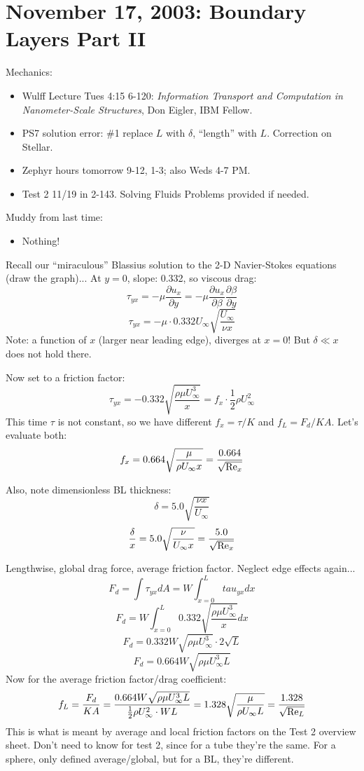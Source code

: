 \documentclass{report}
\begin{document}
\section{November 17, 2003: Boundary Layers Part II}

Mechanics:
\begin{itemize}
\item Wulff Lecture Tues 4:15 6-120: {\em Information Transport and Computation
    in Nanometer-Scale Structures}, Don Eigler, IBM Fellow.
\item PS7 solution error: \#1 replace $L$ with $\delta$, ``length'' with $L$.
  Correction on Stellar.
\item Zephyr hours tomorrow 9-12, 1-3; also Weds 4-7 PM.
\item Test 2 11/19 in 2-143.  Solving Fluids Problems provided if needed.
\end{itemize}

\noindent Muddy from last time:
\begin{itemize}
\item Nothing!
\end{itemize}

Recall our ``miraculous'' Blassius solution to the 2-D Navier-Stokes equations
(draw the graph)...  At $y=0$, slope: 0.332, so viscous drag:
$$\tau_{yx} = -\mu\frac{\partial u_x}{\partial y} =
-\mu \frac{\partial u_x}{\partial\beta}\frac{\partial\beta}{\partial y}$$
$$\tau_{yx} = -\mu\cdot0.332U_\infty\sqrt{\frac{U_\infty}{\nu x}}$$
Note: a function of $x$ (larger near leading edge), diverges at $x=0$!  But
$\delta\ll x$ does not hold there.

Now set to a friction factor:
$$\tau_{yx} = -0.332\sqrt{\frac{\rho\mu U_\infty^3}{x}} =
f_x \cdot \frac{1}{2}\rho U_\infty^2$$
This time $\tau$ is not constant, so we have different $f_x=\tau/K$ and
$f_L=F_d/KA$.  Let's evaluate both:
$$f_x = 0.664\sqrt{\frac{\mu}{\rho U_\infty x}} =
\frac{0.664}{\sqrt{{\rm Re}_x}}$$

Also, note dimensionless BL thickness:
$$\delta = 5.0\sqrt{\frac{\nu x}{U_\infty}}$$
$$\frac{\delta}{x} = 5.0\sqrt{\frac{\nu}{U_\infty x}} =
\frac{5.0}{\sqrt{{\rm Re}_x}}$$

Lengthwise, global drag force, average friction factor.  Neglect edge effects
again...
$$F_d = \int \tau_{yx} dA = W \int_{x=0}^L tau_{yx} dx$$
$$F_d = W \int_{x=0}^L0.332\sqrt{\frac{\rho\mu U_\infty^3}{x}}dx$$
$$F_d = 0.332 W \sqrt{\rho\mu U_\infty^3}\cdot 2\sqrt{L}$$
$$F_d = 0.664 W \sqrt{\rho\mu U_\infty^3 L}$$
Now for the average friction factor/drag coefficient:
$$f_L = \frac{F_d}{KA} = \frac{0.664 W \sqrt{\rho\mu U_\infty^3 L}}
{\frac{1}{2}\rho U_\infty^2 \cdot WL} =
1.328\sqrt{\frac{\mu}{\rho U_\infty L}} = \frac{1.328}{\sqrt{{\rm Re}_L}}$$
This is what is meant by average and local friction factors on the Test 2
overview sheet.  Don't need to know for test 2, since for a tube they're the
same.  For a sphere, only defined average/global, but for a BL, they're
different.
\end{document}
